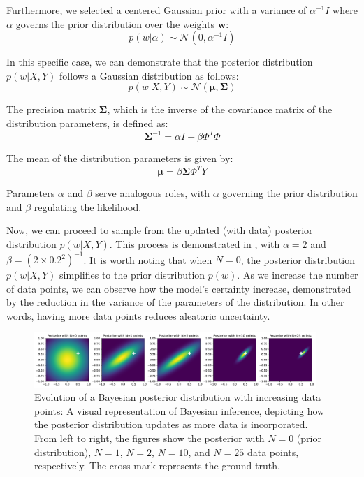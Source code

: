 Furthermore, we selected a centered Gaussian prior with a variance of $ \alpha^{-1}I $ where $\alpha$ governs the prior distribution over the weights $\mathbf{w}$:
\[ p(w | \alpha) \sim \mathcal{N}(0, \alpha^{-1}I) \]

In this specific case, we can demonstrate that the posterior distribution $ p(w | X, Y) $ follows a Gaussian distribution as follows:
\[ p(w | X, Y) \sim \mathcal{N}(\boldsymbol{\mu}, \boldsymbol{\Sigma}) \]

The precision matrix $ \boldsymbol{\Sigma} $, which is the inverse of the covariance matrix of the distribution parameters, is defined as:
\[ \boldsymbol{\Sigma}^{-1} = \alpha I + \beta \Phi^T \Phi \]

\noindent The mean of the distribution parameters is given by:
\[ \boldsymbol{\mu} = \beta \boldsymbol{\Sigma} \Phi^T Y \]

Parameters $\alpha$ and $\beta$ serve analogous roles, with $\alpha$ governing the prior distribution and $\beta$ regulating the likelihood.

Now, we can proceed to sample from the updated (with data) posterior distribution $p(w | X, Y)$. This process is demonstrated in , with $\alpha = 2$ and $\beta = (2 \times 0.2^2)^{-1}$. It is worth noting that when $N=0$, the posterior distribution $p(w|X,Y)$ simplifies to the prior distribution $p(w)$. As we increase the number of data points, we can observe how the model's certainty increase, demonstrated by the reduction in the variance of the parameters of the distribution. In other words, having more data points reduces aleatoric uncertainty.

\begin{figure}[H]
    \centering
    \includegraphics[width=0.95\textwidth]{posterior.pdf}
    \caption{Evolution of a Bayesian posterior distribution with increasing data points: A visual representation of Bayesian inference, depicting how the posterior distribution updates as more data is incorporated. From left to right, the figures show the posterior with $N=0$ (prior distribution), $N=1$, $N=2$, $N=10$, and $N=25$ data points, respectively. The cross mark represents the ground truth.}
    \label{fig:posterior}
\end{figure}

